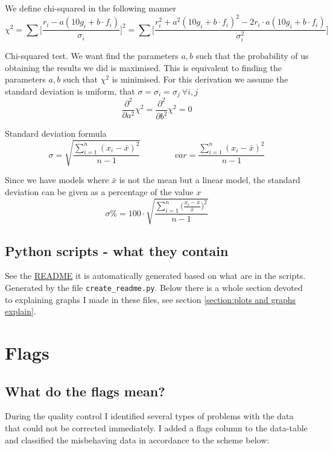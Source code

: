 \documentclass[12pt]{article}
\begin{document}
We define chi-squared in the following manner
\begin{equation}\label{equation:chi-squared}
    \chi^2 = \sum \bigg[ \frac{r_i - a (10g_i + b\cdot f_i)}{\sigma_i} \bigg]^2 = 
    \sum \bigg[ \frac{r_i^2 + a^2(10g_i + b\cdot f_i)^2 - 2r_i\cdot a(10g_i + b\cdot f_i)}{\sigma_i^2} \bigg]
\end{equation}

Chi-squared test. We want find the parameters $a,b$ such that the probability of us obtaining the results we did is maximised. This is equivalent to finding the parameters $a,b$ such that $\chi^2$ is minimised. For this derivation we assume the standard deviation is uniform, that $\sigma = \sigma_i = \sigma_j\ \forall i,j$
\begin{equation}\label{equation:chi squared condition for best fit params}
    \frac{\partial^2}{\partial a^2}\chi^2 = \frac{\partial^2}{\partial b^2}\chi^2 = 0
\end{equation}

Standard deviation formula
\begin{equation}\label{equation:standard deviation}
    \sigma = \sqrt{\frac{\sum_{i=1}^{n} (x_i - \bar{x})^2}{n-1}}  \quad \quad \quad \quad 
    var = \frac{\sum_{i=1}^{n} (x_i - \bar{x})^2}{n-1}
\end{equation}

Since we have models where $\bar{x}$ is not the mean but a linear model, the standard deviation can be given as a percentage of the value $x$
\begin{equation}\label{equation:standard deviation percentage}
    \sigma\% = 100\cdot \sqrt{\frac{\sum_{i=1}^{n}\big(\frac{x_i-\bar{x}}{\bar{x}}\big)^2}{n-1}}
\end{equation}


\subsection{Python scripts - what they contain}
See the \href{https://github.com/dcxSt/DATA_SILSO_HISTO_search}{README} it is automatically generated based on what are in the scripts. Generated by the file \texttt{create\_readme.py}. Below there is a whole section devoted to explaining graphs I made in these files, see section \ref{section:plots and graphs explain}.

\section{Flags}
\subsection{What do the flags mean?}\label{flags section}
During the quality control I identified several types of problems with the data that could not be corrected immediately. I added a flags column to the data-table and classified the misbehaving data in accordance to the scheme below:\\
\end{document}

